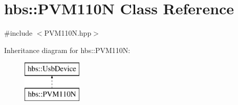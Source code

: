 \hypertarget{classhbs_1_1_p_v_m110_n}{\section{hbs\-:\-:P\-V\-M110\-N Class Reference}
\label{classhbs_1_1_p_v_m110_n}
}


{\ttfamily \#include $<$P\-V\-M110\-N.\-hpp$>$}

Inheritance diagram for hbs\-:\-:P\-V\-M110\-N\-:\begin{figure}[H]
\begin{center}
\leavevmode
\includegraphics[height=2.000000cm]{classhbs_1_1_p_v_m110_n}
\end{center}
\end{figure}
